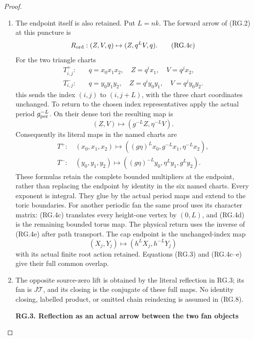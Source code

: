 \begin{proof}
\begin{enumerate}[label=\arabic*.]
\item The endpoint itself is also retained. Put \(L=nk\). The
forward arrow of (RG.2) at this puncture is
\[
             R_{\rm ord}:(Z,V,q)\mapsto(Z,q^LV,q).
                                                        \tag{RG.4c}
\]
For the two triangle charts
\[
 \begin{aligned}
 T^+_{i,j}:\quad &q=x_0x_1x_2,\quad Z=q^ix_1,\quad V=q^jx_2,\\
 T^-_{i,j}:\quad &q=y_0y_1y_2,\quad
 Z=q^iy_0y_1,\quad V=q^jy_0y_2.
 \end{aligned}
\]
this sends the index \((i,j)\) to \((i,j+L)\), with the
three chart coordinates unchanged. To return to the chosen
index representatives apply the actual period
\(g_{\rm per}^{-L}\). On their dense tori the resulting map is
\[
             (Z,V)\mapsto(g^{-L}Z,\eta^{-L}V).        \tag{RG.4d}
\]
Consequently its literal maps in the named charts are
\[
 \begin{split}
 T^+:\ &(x_0,x_1,x_2)\mapsto
       ((g\eta)^Lx_0,g^{-L}x_1,\eta^{-L}x_2),\\
 T^-:\ &(y_0,y_1,y_2)\mapsto
       ((g\eta)^{-L}y_0,\eta^Ly_1,g^Ly_2).
 \end{split}                                         \tag{RG.4e}
\]
These formulas retain the complete bounded multipliers at the
endpoint, rather than replacing the endpoint by identity in
the six named charts. Every exponent is integral. They glue
by the actual period maps and extend to the toric boundaries.
For another periodic fan the same proof uses its character
matrix: (RG.4c) translates every height-one vertex by
\((0,L)\), and (RG.4d) is the remaining bounded torus map.
The physical return uses the inverse of (RG.4e) after path
transport. The cap endpoint is the unchanged-index map
\[
       (X_j,Y_j)\mapsto(h^LX_j,h^{-L}Y_j)
\]
with its actual finite root action retained. Equations
(RG.3) and (RG.4c--e) give their full common overlap.

\item The opposite source-zero lift is obtained by the literal
reflection in RG.3; its fan is \(J\mathcal T\), and its
closing is the conjugate of these full maps. No identity
closing, labelled product, or omitted chain reindexing is
assumed in (RG.8).

\par

\medskip\noindent\textbf{RG.3. Reflection as an actual arrow between the two fan objects}

\par\nobreak


\end{enumerate}
\end{proof}
